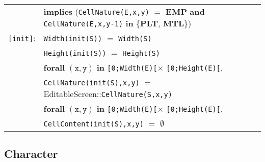\documentclass[8pt]{article}
\begin{document}
{\begin{longtable}{rl}
  & \quad\quad \textbf{implies} (\texttt{CellNature(E,x,y)} $=$ \textbf{EMP} \textbf{and} \texttt{CellNature(E,x,y-1)} \textbf{in} \{\textbf{PLT}, \textbf{MTL}\})\\
  \texttt{[init]}: & \texttt{Width(init(S))} $=$ \texttt{Width(S)} \\
  & \texttt{Height(init(S))} $=$ \texttt{Height(S)} \\
  & \textbf{forall} $(\mathtt{x},\mathtt{y})$ \textbf{in} \texttt{[0;Width(E)[}$\times$ \texttt{[0;Height(E)[}, \\
  & \quad\quad \texttt{CellNature(init(S),x,y)} $=$ \textrm{EditableScreen}::\texttt{CellNature(S,x,y)} \\
  & \textbf{forall} $(\mathtt{x},\mathtt{y})$ \textbf{in} \texttt{[0;Width(E)[}$\times$ \texttt{[0;Height(E)[}, \\
  & \quad\quad \texttt{CellContent(init(S),x,y)} $=$ $\emptyset$ \\
\end{longtable}}

\subsection{Character}
\end{document}
